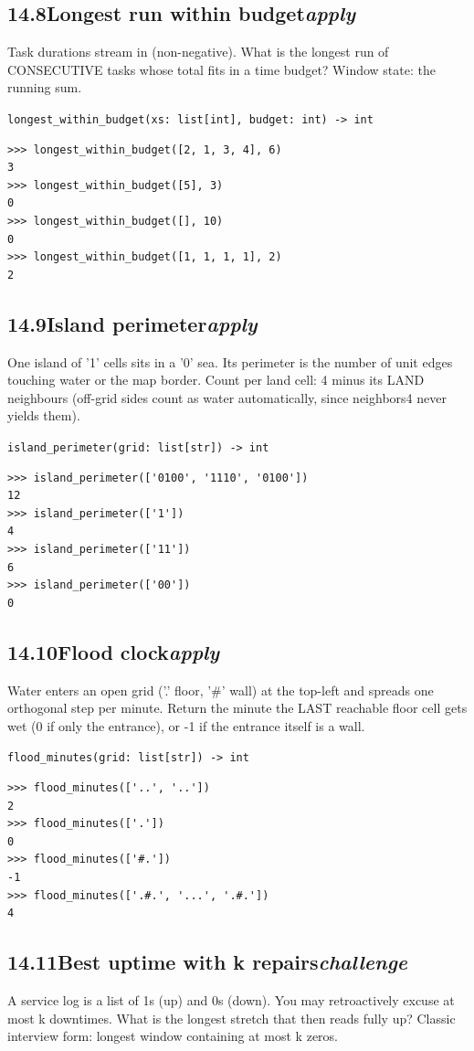 \documentclass[10pt,letterpaper]{book}
\begin{document}
\subsection*{14.8\quad Longest run within budget\hfill\textnormal{\textit{apply}}}
Task durations stream in (non-negative). What is the longest run of CONSECUTIVE tasks whose total fits in a time budget? Window state: the running sum.

\noindent\texttt{longest\_within\_budget(xs: list[int], budget: int) -> int}
\begin{lstlisting}[style=ex]
>>> longest_within_budget([2, 1, 3, 4], 6)
3
>>> longest_within_budget([5], 3)
0
>>> longest_within_budget([], 10)
0
>>> longest_within_budget([1, 1, 1, 1], 2)
2
\end{lstlisting}
\subsection*{14.9\quad Island perimeter\hfill\textnormal{\textit{apply}}}
One island of '1' cells sits in a '0' sea. Its perimeter is the number of unit edges touching water or the map border. Count per land cell: 4 minus its LAND neighbours (off-grid sides count as water automatically, since neighbors4 never yields them).

\noindent\texttt{island\_perimeter(grid: list[str]) -> int}
\begin{lstlisting}[style=ex]
>>> island_perimeter(['0100', '1110', '0100'])
12
>>> island_perimeter(['1'])
4
>>> island_perimeter(['11'])
6
>>> island_perimeter(['00'])
0
\end{lstlisting}
\subsection*{14.10\quad Flood clock\hfill\textnormal{\textit{apply}}}
Water enters an open grid ('.' floor, '\#' wall) at the top-left and spreads one orthogonal step per minute. Return the minute the LAST reachable floor cell gets wet (0 if only the entrance), or -1 if the entrance itself is a wall.

\noindent\texttt{flood\_minutes(grid: list[str]) -> int}
\begin{lstlisting}[style=ex]
>>> flood_minutes(['..', '..'])
2
>>> flood_minutes(['.'])
0
>>> flood_minutes(['#.'])
-1
>>> flood_minutes(['.#.', '...', '.#.'])
4
\end{lstlisting}
\subsection*{14.11\quad Best uptime with k repairs\hfill\textnormal{\textit{challenge}}}
A service log is a list of 1s (up) and 0s (down). You may retroactively excuse at most k downtimes. What is the longest stretch that then reads fully up? Classic interview form: longest window containing at most k zeros.
\end{document}
